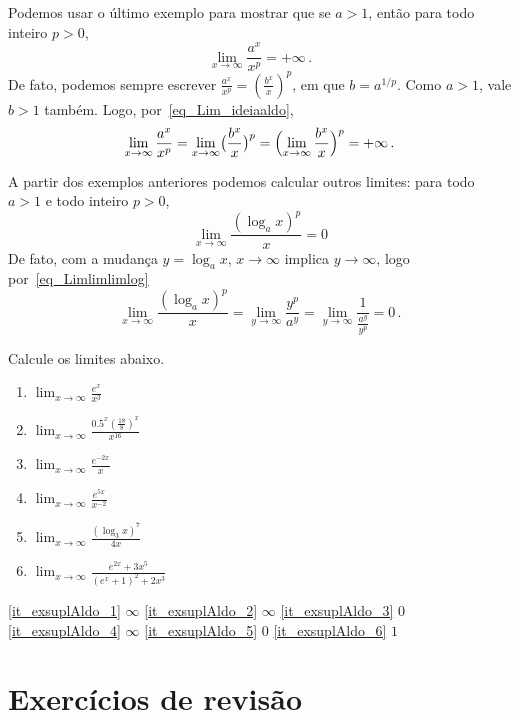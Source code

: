 \begin{ex}
Podemos usar o último exemplo para mostrar que 
se $a>1$, então para todo inteiro $p>0$,
\begin{equation}\label{eq_Limlimlimlog} 
\boxed{
\lim_{x\to\infty}\frac{a^x}{x^p}=+\infty\,.
}
\end{equation}
De fato, podemos sempre escrever
$\frac{a^x}{x^p}=(\frac{b^x}{x})^p$, em que $b=a^{1/p}$. Como
$a>1$, vale $b>1$ também. Logo, por~\eqref{eq_Lim_ideiaaldo},
\[ 
\lim_{x\to\infty}\frac{a^x}{x^p}=
\lim_{x\to\infty}\bigl(\frac{b^x}{x}\bigr)^p=
\Bigl(\lim_{x\to\infty}\frac{b^x}{x}\Bigr)^p=+\infty\,.
\]
\end{ex}
A partir dos exemplos anteriores podemos calcular outros
limites: para todo $a>1$ e todo inteiro $p>0$,
\[ 
\boxed{
\lim_{x\to\infty}\frac{(\log_a x)^p}{x}=0
}
\]
De fato, com a mudança $y=\log_a x$, $x\to\infty$ implica
$y\to \infty$, logo por~\eqref{eq_Limlimlimlog}
\[ 
\lim_{x\to\infty}\frac{(\log_a x)^p}{x}=
\lim_{y\to\infty}\frac{y^p}{a^y}=
\lim_{y\to\infty}\frac{1}{\frac{a^y}{y^p}}=0\,.
\]
\begin{exo}
Calcule os limites abaixo.  
\begin{multicols}{3}
\begin{enumerate}
\item\label{it_exsuplAldo_1}
$\lim_{x\to\infty}\frac{e^{x}}{x^3}$
\item\label{it_exsuplAldo_2}
$\lim_{x\to\infty}\frac{0.5^x(\tfrac{18}{8})^x}{x^{16}}$
\item\label{it_exsuplAldo_3}
$\lim_{x\to\infty}\frac{e^{-2x}}{x}$
\item\label{it_exsuplAldo_4}
$\lim_{x\to\infty}\frac{e^{5x}}{x^{-2}}$
\item\label{it_exsuplAldo_5}
$\lim_{x\to\infty}\frac{(\log_3x)^{7}}{4x}$
\item\label{it_exsuplAldo_6}
$\lim_{x\to\infty}\frac{e^{2x}+3x^5}{(e^x+1)^2+2x^3}$
\end{enumerate}
\end{multicols}
\vspace{0.1mm}
\begin{sol}
\eqref{it_exsuplAldo_1} $\infty$
\eqref{it_exsuplAldo_2} $\infty$
\eqref{it_exsuplAldo_3} $0$
\eqref{it_exsuplAldo_4} $\infty$
\eqref{it_exsuplAldo_5} $0$
\eqref{it_exsuplAldo_6} $1$
\end{sol}
\end{exo}

\section{Exercícios de revisão}

